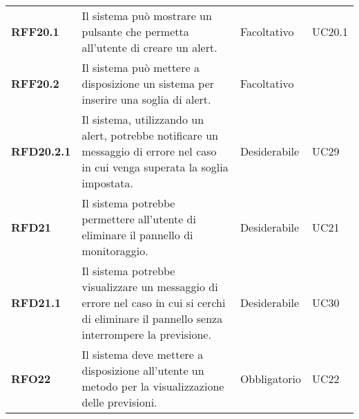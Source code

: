 \begin{longtable}[H]{>{\centering\bfseries}m{2cm} >{\centering}m{9cm} >{\centering}m{2.5cm} >{\centering\arraybackslash}m{2.5cm}}
  \textbf{RFF20.1} & Il sistema può mostrare un pulsante che permetta all'utente di creare un alert. & Facoltativo & UC20.1 \\
  \textbf{RFF20.2} & Il sistema può mettere a disposizione un sistema per inserire una soglia di alert. & Facoltativo & 20.2 \\
  \textbf{RFD20.2.1} & Il sistema, utilizzando un alert, potrebbe notificare un messaggio di errore nel caso in cui venga superata la soglia impostata. & Desiderabile & UC29 \\
  \textbf{RFD21} & Il sistema potrebbe permettere all'utente di eliminare il pannello di monitoraggio. & Desiderabile & UC21 \\
  \textbf{RFD21.1} & Il sistema potrebbe visualizzare un messaggio di errore nel caso in cui si cerchi di eliminare il pannello senza interrompere la previsione. & Desiderabile & UC30 \\
  \textbf{RFO22} & Il sistema deve mettere a disposizione all'utente un metodo per la visualizzazione delle previsioni. & Obbligatorio & UC22 \\
\end{longtable}

